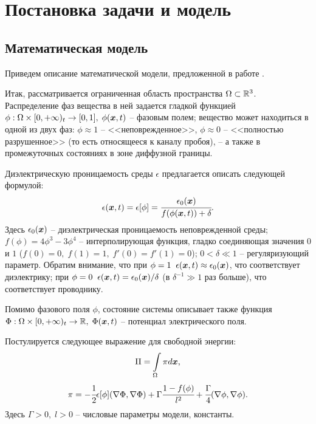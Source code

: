 
\section{Постановка задачи и модель}

\subsection{Математическая модель}

Приведем описание математической модели, предложенной в работе \cite{pitike_dielectric_breakdown}.

Итак, рассматривается ограниченная область пространства $\Omega \subset {\mathbb{R}}^3$. Распределение фаз вещества в ней задается гладкой функцией $\phi: \Omega \times [0, +\infty)_t \to [0, 1], \; \phi({\boldsymbol{x}}, t)$ -- фазовым полем; вещество может находиться в одной из двух фаз: $\phi \approx 1$ -- <<неповрежденное>>, $\phi \approx 0$ -- <<полностью разрушенное>> (то есть относящееся к каналу пробоя), -- а также в промежуточных состояниях в зоне диффузной границы.

Диэлектрическую проницаемость среды $\epsilon$ предлагается описать следующей формулой:
\begin{equation}
    \epsilon({\boldsymbol{x}}, t) = \epsilon[\phi] = \cfrac{\epsilon_0({\boldsymbol{x}})}{f(\phi({\boldsymbol{x}}, t)) + \delta} {\text{.}}
    \label{eq:epsilon}
\end{equation}
Здесь $\epsilon_0({\boldsymbol{x}})$ -- диэлектрическая проницаемость неповрежденной среды; $f(\phi) = 4\phi^3 - 3\phi^4$ -- интерполирующая функция, гладко соединяющая значения $0$ и $1$ ($f(0) = 0, \; f(1) = 1, \; f'(0) = f'(1) = 0$); $0 < \delta \ll 1$ -- регуляризующий параметр. Обратим внимание, что при $\phi = 1 \;\; \epsilon({\boldsymbol{x}}, t) \approx \epsilon_0({\boldsymbol{x}})$, что соответствует диэлектрику; при $\phi = 0 \;\; \epsilon({\boldsymbol{x}}, t) = \epsilon_0({\boldsymbol{x}}) / \delta$ (в $\delta^{-1} \gg 1$ раз больше), что соответствует проводнику.

Помимо фазового поля $\phi$, состояние системы описывает также функция $\Phi: \Omega \times [0, +\infty)_t \to {\mathbb{R}}, \; \Phi({\boldsymbol{x}}, t)$ -- потенциал электрического поля.

Постулируется следующее выражение для свободной энергии:
\begin{equation}
    \Pi = \int \limits_\Omega \pi d {\boldsymbol{x}} {\text{,}}
    \label{eq:free_energy}
\end{equation}
\begin{equation}
    \pi = -\cfrac{1}{2} \epsilon[\phi] (\nabla \Phi, \nabla \Phi) + \Gamma \cfrac{1 - f(\phi)}{l^2} + \cfrac{\Gamma}{4} (\nabla \phi, \nabla \phi) {\text{.}}
    \label{eq:free_energy_density}
\end{equation}
Здесь $\Gamma > 0, \; l > 0$ -- числовые параметры модели, константы.

